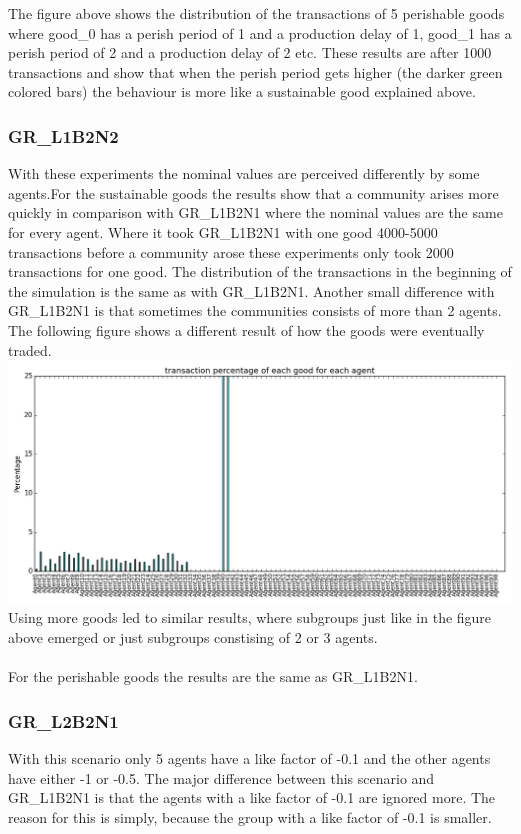 \documentclass[twoside,openright]{uva-bachelor-thesis}
\begin{document}
The figure above shows the distribution of the transactions of 5 perishable goods where good\_0 has a perish period of 1 and a production delay of 1, good\_1 has a perish period of 2 and a production delay of 2 etc. These results are after 1000 transactions and show that when the perish period gets higher (the darker green colored bars) the behaviour is more like a sustainable good explained above.

\subsubsection{GR\_L1B2N2}
With these experiments the nominal values are perceived differently by some agents.For the sustainable goods the results show that a community arises more quickly in comparison with GR\_L1B2N1 where the nominal values are the same for every agent. Where it took GR\_L1B2N1 with one good 4000-5000 transactions before a community arose these experiments only took 2000 transactions for one good. The distribution of the transactions in the beginning of the simulation is the same as with GR\_L1B2N1. Another small difference with  GR\_L1B2N1 is that sometimes the communities consists of more than 2 agents. The following figure shows a different result of how the goods were eventually traded. \\
\includegraphics[scale=0.4]{GR_L1B2N2/15ktransactions2goods}
Using more goods led to similar results, where subgroups just like in the figure above emerged or just subgroups constising of 2 or 3 agents.
\\
\\
For the perishable goods the results are the same as GR\_L1B2N1.
\subsubsection{GR\_L2B2N1}
With this scenario only 5 agents have a like factor of -0.1 and the other agents have either -1 or -0.5. The major difference between this scenario and GR\_L1B2N1 is that the agents with a like factor of -0.1 are ignored more. The reason for this is simply, because the group with a like factor of -0.1 is smaller.
\end{document}
